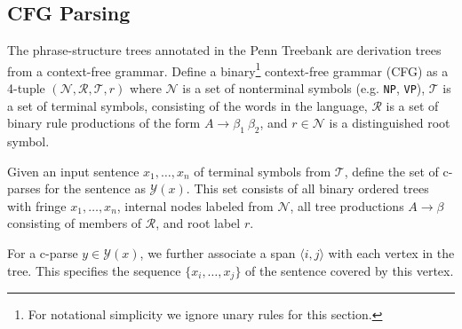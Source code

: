 \documentclass[11pt,letterpaper]{article}
\newcommand{\nonterms}{\mathcal{N}}
\newcommand{\rules}{\mathcal{R}}
\newcommand{\terms}{\mathcal{T}}
\newcommand{\Span}[1]{\langle #1 \rangle}
\newcommand{\Tag}[1]{\texttt{#1}}
\newcommand{\Root}{r}
\newcommand{\Rule}[3]{#1 \rightarrow #2\ #3}
\newcommand{\RuleA}[3]{#1 \rightarrow #2^*\ #3}
\newcommand{\RuleB}[3]{#1 \rightarrow #2\ #3^*}
\begin{document}

\subsection{CFG Parsing}

The phrase-structure trees annotated in the Penn Treebank are derivation trees from a context-free grammar. 
Define a binary\footnote{For notational simplicity we ignore unary rules for this section.} context-free grammar (CFG) as a 4-tuple $(\nonterms, \rules, \terms, \Root)$ where $\nonterms$ is a set of nonterminal symbols (e.g. \Tag{NP},
  \Tag{VP}), $\terms$ is a set of terminal symbols, consisting of the
  words in the language, $\rules$ is a set of binary rule productions
  of the form $\Rule{A}{\beta_1}{\beta_2}$, and  $\Root \in \nonterms$ is  a distinguished root symbol.


Given an input sentence $x_1, \ldots, x_n$ of terminal symbols from
$\terms$, define the set of c-parses for the sentence as
$\mathcal{Y}(x)$. This set consists of all binary ordered trees with
fringe $x_1, \ldots, x_n$, internal nodes labeled from $\nonterms$,
all tree productions $A \rightarrow \beta$ consisting of members of
$\rules$, and root label $\Root$.

For a c-parse $y \in \mathcal{Y}(x)$,
we further associate a span $\Span{i, j}$ with each vertex in the tree. This specifies the 
sequence $\{x_i, \ldots, x_j\}$ of the sentence covered by this vertex.


\end{document}
